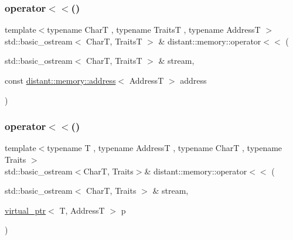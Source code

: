 \subsubsection{\texorpdfstring{operator$<$$<$()}{operator<<()}\hspace{0.1cm}{\footnotesize\ttfamily [1/2]}}
{\footnotesize\ttfamily template$<$typename CharT , typename TraitsT , typename AddressT $>$ \\
std\+::basic\+\_\+ostream$<$ CharT, TraitsT $>$ \& distant\+::memory\+::operator$<$$<$ (\begin{DoxyParamCaption}\item[{std\+::basic\+\_\+ostream$<$ CharT, TraitsT $>$ \&}]{stream,  }\item[{const \mbox{\hyperlink{classdistant_1_1memory_1_1address}{distant\+::memory\+::address}}$<$ AddressT $>$}]{address }\end{DoxyParamCaption})}

\mbox{\label{namespacedistant_1_1memory_a9fa01f25df79ff7c22a84d717fdb4539}} 
\subsubsection{\texorpdfstring{operator$<$$<$()}{operator<<()}\hspace{0.1cm}{\footnotesize\ttfamily [2/2]}}
{\footnotesize\ttfamily template$<$typename T , typename AddressT , typename CharT , typename Traits $>$ \\
std\+::basic\+\_\+ostream$<$CharT, Traits$>$\& distant\+::memory\+::operator$<$$<$ (\begin{DoxyParamCaption}\item[{std\+::basic\+\_\+ostream$<$ CharT, Traits $>$ \&}]{stream,  }\item[{\mbox{\hyperlink{classdistant_1_1memory_1_1virtual__ptr}{virtual\+\_\+ptr}}$<$ T, AddressT $>$}]{p }\end{DoxyParamCaption})}

\mbox{\label{namespacedistant_1_1memory_a266da479d4c10610b10d6ad71986cf39}} 
